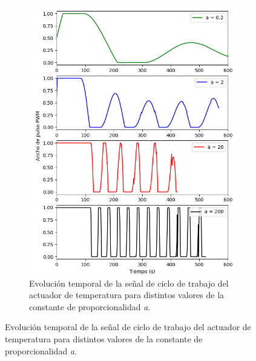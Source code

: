 \documentclass[a4paper,11pt]{article}
\begin{document}
\begin{figure}[!ht]
\begin{figure}[!ht]
\centering
\includegraphics[width=\textwidth]{figs/lazo_duty}
\caption{Evolución temporal de la señal de ciclo de trabajo del actuador
de temperatura para distintos valores de la constante de
proporcionalidad \emph{a}.}
\label{fig:lazo_duty}
\end{figure}


\end{figure}
\end{document}
